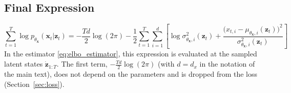 \subsection*{Final Expression}
\begin{equation}
    \sum_{t=1}^T \log p_{\theta_{\bm{x}}}(\bm{x}_t | \bm{z}_{t}) = 
    - \frac{Td}{2} \log(2\pi) - \frac{1}{2} \sum_{t=1}^T 
    \sum_{i=1}^d \left[ \log \sigma^2_{\theta_{\bm{x}}, i}(\bm{z}_{t}) +
    \frac{\big(x_{t,i} - \mu_{\theta_{\bm{x}}, i}(\bm{z}_{t})\big)^2}
    {\sigma^2_{\theta_{\bm{x}}, i}(\bm{z}_{t})} \right]
    \label{eq:sum_log_p_theta_x_given_z}
\end{equation}
\noindent In the estimator \eqref{eq:elbo_estimator}, this expression is
evaluated at the sampled latent states $\dot{\bm{z}}_{1:T}$. The first
term, $-\frac{Td}{2}\log(2\pi)$ (with $d = d_x$ in the notation of the
main text), does not depend on the parameters and is dropped from the
loss (Section~\ref{sec:loss}).
